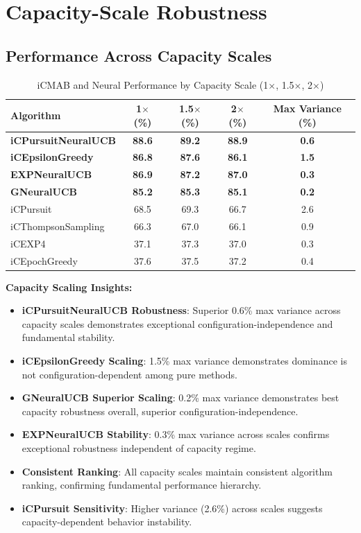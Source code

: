 \documentclass[12pt,a4paper]{article}
\newcommand{\primarytext}[1]{\textcolor{primaryblue}{\textbf{#1}}}
\newcommand{\secondarytext}[1]{\textcolor{secondaryblue}{\textbf{#1}}}
\newcommand{\warning}[1]{\textcolor{warningred}{\textbf{#1}}}
\newcommand{\legacy}[1]{\textcolor{legacycolor}{\textbf{#1}}}
\newcommand{\neural}[1]{\textcolor{neuralcolor}{\textbf{#1}}}
\begin{document}
\section{Capacity-Scale Robustness}

\subsection{Performance Across Capacity Scales}

\begin{table}[H]
\centering
\caption{iCMAB and Neural Performance by Capacity Scale (1$\times$, 1.5$\times$, 2$\times$)}
\label{tab:capacity-scale}
\begin{tabular}{@{}lcccc@{}}
\toprule
\textbf{Algorithm} & \textbf{1$\times$ (\%)} & \textbf{1.5$\times$ (\%)} & \textbf{2$\times$ (\%)} & \textbf{Max Variance (\%)} \\
\midrule
\neural{iCPursuitNeuralUCB}   & \neural{88.6} & \neural{89.2} & \neural{88.9} & \neural{0.6} \\
\primarytext{iCEpsilonGreedy}   & \primarytext{86.8} & \primarytext{87.6} & \primarytext{86.1} & \primarytext{1.5} \\
\legacy{EXPNeuralUCB}           & \legacy{86.9} & \legacy{87.2} & \legacy{87.0} & \legacy{0.3} \\
\neural{GNeuralUCB}            & \neural{85.2} & \neural{85.3} & \neural{85.1} & \neural{0.2} \\
iCPursuit                       & 68.5 & 69.3 & 66.7 & 2.6 \\
iCThompsonSampling              & 66.3 & 67.0 & 66.1 & 0.9 \\
iCEXP4                          & 37.1 & 37.3 & 37.0 & 0.3 \\
iCEpochGreedy                   & 37.6 & 37.5 & 37.2 & 0.4 \\
\bottomrule
\end{tabular}
\end{table}

\textbf{Capacity Scaling Insights:}
\begin{itemize}
\item \neural{iCPursuitNeuralUCB Robustness}: Superior 0.6\% max variance across capacity scales demonstrates exceptional configuration-independence and fundamental stability.
\item \primarytext{iCEpsilonGreedy Scaling}: 1.5\% max variance demonstrates dominance is not configuration-dependent among pure methods.
\item \neural{GNeuralUCB Superior Scaling}: 0.2\% max variance demonstrates best capacity robustness overall, superior configuration-independence.
\item \legacy{EXPNeuralUCB Stability}: 0.3\% max variance across scales confirms exceptional robustness independent of capacity regime.
\item \secondarytext{Consistent Ranking}: All capacity scales maintain consistent algorithm ranking, confirming fundamental performance hierarchy.
\item \warning{iCPursuit Sensitivity}: Higher variance (2.6\%) across scales suggests capacity-dependent behavior instability.
\end{itemize}
\end{document}
